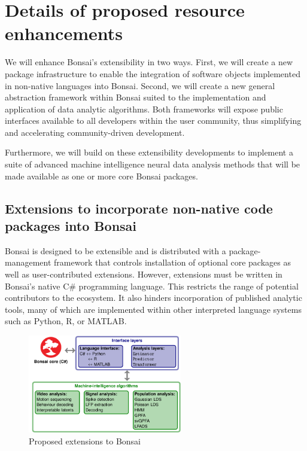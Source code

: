 

\section{Details of proposed resource enhancements}

We will enhance Bonsai's extensibility in two ways.
%
First, we will create a new package infrastructure to enable the integration of software objects implemented in non-native languages into Bonsai.
%
Second, we will create a new general abstraction framework within Bonsai suited to the implementation and application of data analytic algorithms.
%
Both frameworks will expose public interfaces available to all developers within the user community, thus simplifying and accelerating community-driven development.

Furthermore, we will build on these extensibility developments to implement a suite of advanced machine intelligence neural data analysis methods that will be made available as one or more core Bonsai packages.

\subsection{Extensions to incorporate non-native code packages into Bonsai}

Bonsai is designed to be extensible and is distributed with a package-management framework that controls installation of optional core packages as well as user-contributed extensions.
%
However, extensions must be written in Bonsai's native C\# programming language.
%
This restricts the range of potential contributors to the ecosystem.
%
It also hinders incorporation of published analytic tools, many of which are implemented within other interpreted language systems such as Python, R, or MATLAB.  
\begin{figure}
  \includegraphics[width=0.6\textwidth]{figures/extensions.pdf}%
%   
  \caption{Proposed extensions to Bonsai}
  \label{fig:proposedBonsaiExtensions}
\end{figure}


